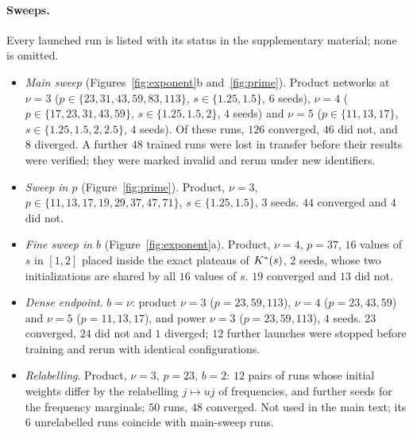 \paragraph{Sweeps.} Every launched run is listed with its status in the supplementary material; none is omitted.
\begin{itemize}
\item \emph{Main sweep} (Figures~\ref{fig:exponent}b and~\ref{fig:prime}). Product networks at $\nu=3$ ($p\in\{23,31,43,59,83,113\}$, $s\in\{1.25,1.5\}$, $6$ seeds), $\nu=4$ ($p\in\{17,23,31,43,59\}$, $s\in\{1.25,1.5,2\}$, $4$ seeds) and $\nu=5$ ($p\in\{11,13,17\}$, $s\in\{1.25,1.5,2,2.5\}$, $4$ seeds). Of these runs, $126$ converged, $46$ did not, and $8$ diverged. A further $48$ trained runs were lost in transfer before their results were verified; they were marked invalid and rerun under new identifiers.
\item \emph{Sweep in $p$} (Figure~\ref{fig:prime}). Product, $\nu=3$, $p\in\{11,13,17,19,29,37,47,71\}$, $s\in\{1.25,1.5\}$, $3$ seeds. $44$ converged and $4$ did not.
\item \emph{Fine sweep in $b$} (Figure~\ref{fig:exponent}a). Product, $\nu=4$, $p=37$, $16$ values of $s$ in $[1,2]$ placed inside the exact plateaus of $K^{*}(s)$, $2$ seeds, whose two initializations are shared by all $16$ values of $s$. $19$ converged and $13$ did not.
\item \emph{Dense endpoint}. $b=\nu$: product $\nu=3$ ($p=23,59,113$), $\nu=4$ ($p=23,43,59$) and $\nu=5$ ($p=11,13,17$), and power $\nu=3$ ($p=23,59,113$), $4$ seeds. $23$ converged, $24$ did not and $1$ diverged; $12$ further launches were stopped before training and rerun with identical configurations.
\item \emph{Relabelling}. Product, $\nu=3$, $p=23$, $b=2$: $12$ pairs of runs whose initial weights differ by the relabelling $j\mapsto uj$ of frequencies, and further seeds for the frequency marginals; $50$ runs, $48$ converged. Not used in the main text; its $6$ unrelabelled runs coincide with main-sweep runs.
\end{itemize}

